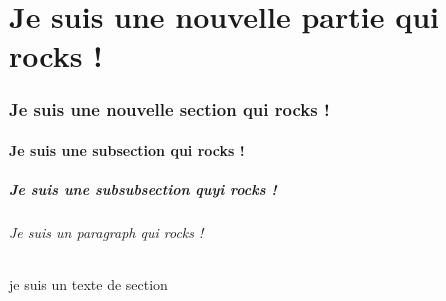 



\dominitoc

\maketitle
\tableofcontents 

\part{Je suis une nouvelle partie qui rocks !}
\section{Je suis une nouvelle section qui rocks !}
\subsection{Je suis une subsection qui rocks !}
\subsubsection{Je suis une subsubsection quyi rocks !}
\paragraph{Je suis un paragraph qui rocks !}
je suis un texte de section 


